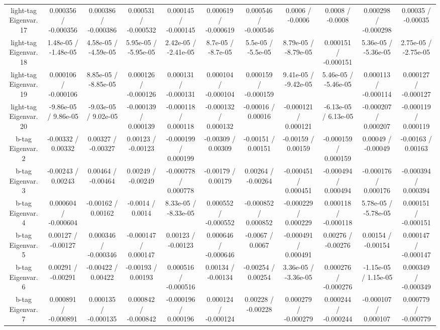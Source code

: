 {\begin{landscape}
\begin{longtable}{@{\extracolsep{\fill}}| *{11}{c|}}
  light-tag Eigenvar. 17 & 0.000356 / -0.000356 & 0.000386 / -0.000386 & 0.000531 / -0.000532 & 0.000145 / -0.000145 & 0.000619 / -0.000619 & 0.000546 / -0.000546 & 0.0006 / -0.0006 & 0.0008 / -0.0008 & 0.000298 / -0.000298 & 0.00035 / -0.00035 \\ 
  light-tag Eigenvar. 18 & 1.48e-05 / -1.48e-05 & 4.58e-05 / -4.59e-05 & 5.95e-05 / -5.95e-05 & 2.42e-05 / -2.41e-05 & 8.7e-05 / -8.7e-05 & 5.5e-05 / -5.5e-05 & 8.79e-05 / -8.79e-05 & 0.000151 / -0.000151 & 5.36e-05 / -5.36e-05 & 2.75e-05 / -2.75e-05 \\ 
  light-tag Eigenvar. 19 & 0.000106 / -0.000106 & 8.85e-05 / -8.85e-05 & 0.000126 / -0.000126 & 0.000131 / -0.000131 & 0.000104 / -0.000104 & 0.000159 / -0.000159 & 9.41e-05 / -9.42e-05 & 5.46e-05 / -5.46e-05 & 0.000113 / -0.000114 & 0.000127 / -0.000127 \\ 
  light-tag Eigenvar. 20 & -9.86e-05 / 9.86e-05 & -9.03e-05 / 9.02e-05 & -0.000139 / 0.000139 & -0.000118 / 0.000118 & -0.000132 / 0.000132 & -0.00016 / 0.00016 & -0.000121 / 0.000121 & -6.13e-05 / 6.13e-05 & -0.000207 / 0.000207 & -0.000119 / 0.000119 \\ 
  b-tag Eigenvar. 2 & -0.00332 / 0.00332 & 0.00327 / -0.00327 & 0.00123 / -0.00123 & -0.000199 / 0.000199 & -0.00309 / 0.00309 & -0.00151 / 0.00151 & -0.00159 / 0.00159 & -0.000159 / 0.000159 & 0.00049 / -0.00049 & -0.00163 / 0.00163 \\ 
  b-tag Eigenvar. 3 & -0.00243 / 0.00243 & 0.00464 / -0.00464 & 0.00249 / -0.00249 & -0.000778 / 0.000778 & -0.00179 / 0.00179 & 0.00264 / -0.00264 & -0.000451 / 0.000451 & -0.000494 / 0.000494 & -0.000176 / 0.000176 & -0.000394 / 0.000394 \\ 
  b-tag Eigenvar. 4 & 0.000604 / -0.000604 & -0.00162 / 0.00162 & -0.0014 / 0.0014 & 8.33e-05 / -8.33e-05 & 0.000552 / -0.000552 & -0.000852 / 0.000852 & -0.000229 / 0.000229 & 0.000118 / -0.000118 & 5.78e-05 / -5.78e-05 & 0.000151 / -0.000151 \\ 
  b-tag Eigenvar. 5 & 0.00127 / -0.00127 & 0.000346 / -0.000346 & -0.000147 / 0.000147 & 0.00123 / -0.00123 & 0.000646 / -0.000646 & -0.0067 / 0.0067 & -0.000491 / 0.000491 & 0.00276 / -0.00276 & 0.00154 / -0.00154 & 0.000147 / -0.000147 \\ 
  b-tag Eigenvar. 6 & 0.00291 / -0.00291 & -0.00422 / 0.00422 & -0.00193 / 0.00193 & 0.000516 / -0.000516 & 0.00134 / -0.00134 & -0.00254 / 0.00254 & 3.36e-05 / -3.36e-05 & 0.000276 / -0.000276 & -1.15e-05 / 1.15e-05 & 0.000349 / -0.000349 \\ 
  b-tag Eigenvar. 7 & 0.000891 / -0.000891 & 0.000135 / -0.000135 & 0.000842 / -0.000842 & -0.000196 / 0.000196 & 0.000124 / -0.000124 & 0.00228 / -0.00228 & 0.000279 / -0.000279 & 0.000244 / -0.000244 & -0.000107 / 0.000107 & 0.000779 / -0.000779 \\ 

\end{longtable}
\end{landscape}}
